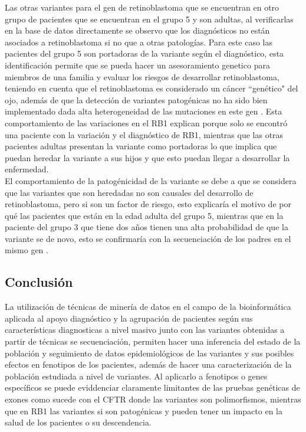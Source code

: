 Las otras variantes para el gen de retinoblastoma que se encuentran en otro grupo de pacientes  que se encuentran en el grupo 5 y son adultas, al verificarlas en la base de datos directamente se observo que los diagnósticos no están asociados a retinoblastoma si no que a otras patologías. Para este caso las pacientes del grupo 5 son portadoras de la variante según el diagnóstico, esta identificación permite que se pueda hacer un asesoramiento genetico para miembros de una familia y evaluar los riesgos de desarrollar retinoblastoma, teniendo en cuenta que el retinoblastoma es considerado un cáncer ``genético" del ojo, además de que la detección de variantes patogénicas no ha sido bien implementado dada alta heterogeneidad de las mutaciones en este gen \cite{Yousef2018}. Esta comportamiento de las  variaciones en el RB1 explican porque solo se encontró una paciente con la variación y el diagnóstico de RB1, mientras que las otras pacientes adultas presentan la variante como portadoras lo que implica que puedan heredar la variante a sus hijos y que esto puedan llegar a desarrollar la enfermedad. \\ 

El comportamiento de la patogénicidad de la variante se debe a que se considera que las variantes que son heredadas no son causales del desarrollo de retinoblastoma, pero si son un factor de riesgo, esto explicaría el motivo de por qué  las pacientes que están en la edad adulta del grupo 5, mientras que en la paciente del grupo 3 que tiene dos años tienen una alta probabilidad de que la variante se de novo, esto se confirmaría con la secuenciación de los padres en el mismo gen \cite{Parma2017}. \\

\subsection{Conclusión}

La utilización de técnicas de minería de datos en el campo de la bioinformática aplicada al apoyo diagnóstico y  la agrupación de pacientes según sus características diagnosticas a nivel masivo junto con las variantes obtenidas a partir de técnicas se secuenciación, permiten hacer una inferencia del estado de la población y seguimiento de datos epidemiológicos de las variantes y sus posibles efectos en fenotipos de los pacientes, además de hacer una caracterización de la población estudiada a nivel de variantes. Al aplicarlo a fenotipos o genes específicos se puede eviddenciar claramente limitantes de las pruebas genéticas de exones como sucede con el CFTR donde las variantes son polimorfismos, mientras que en RB1 las variantes si son patogénicas y pueden tener un impacto en la salud de los pacientes o su descendencia.  


